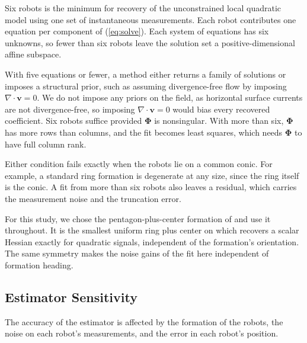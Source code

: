 \documentclass[lettersize,journal]{IEEEtran}
\begin{document}
Six robots is the minimum for recovery of the unconstrained local
quadratic model using one set of instantaneous measurements. Each robot contributes one equation per component of
(\ref{eq:solve}). Each system of equations has six unknowns, so fewer than six
robots leave the solution set a positive-dimensional affine subspace.

With five equations or fewer, a method either returns a family of solutions or imposes a structural prior, such as assuming
divergence-free flow by imposing $\nabla\cdot\mathbf{v} = 0$. We do not impose any priors on the field, as horizontal surface
currents are not divergence-free, so imposing
$\nabla\cdot\mathbf{v} = 0$ would bias every recovered coefficient.
Six robots suffice provided $\boldsymbol{\Phi}$ is nonsingular. With
more than six, $\boldsymbol{\Phi}$ has more rows than columns, and the fit
becomes least squares, which needs $\boldsymbol{\Phi}$ to have full column rank.

Either condition fails exactly when the robots lie on a common conic.
For example, a standard ring formation is degenerate at any size, since
the ring itself is the conic. A fit from more than six robots also
leaves a residual, which carries the measurement noise and the
truncation error.


For this study, we chose the pentagon-plus-center formation of \cite{5} and use it
throughout. It is the smallest uniform ring plus center on which \cite{5}
recovers a scalar Hessian exactly for quadratic signals, independent of
the formation's orientation. The same symmetry makes the noise gains of
the fit here independent of formation heading.


\subsection{Estimator Sensitivity}
\label{sec:sensitivity}

The accuracy of the estimator is affected by the formation of the
robots, the noise on each robot's measurements, and the error in each
robot's position.
\end{document}

